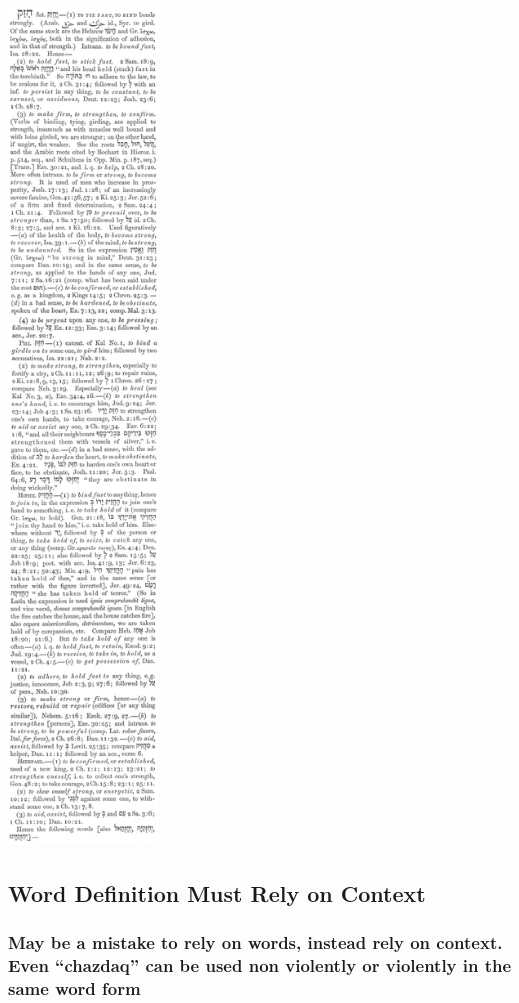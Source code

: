 \documentclass[11pt]{article}
\begin{document}
\includegraphics[width=4cm]{chazak}


\subsection{Word Definition Must Rely on Context}


\subsubsection{May be a mistake to rely on words, instead rely on context. Even “chazdaq” can be used non violently or violently in the same word form}
\end{document}
